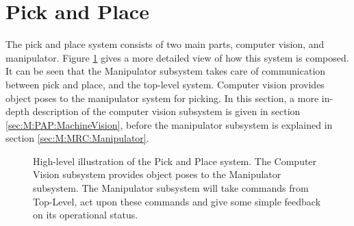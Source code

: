 





\newpage
\section{Pick and Place} \label{M:PickAndPlace}
The pick and place system consists of two main parts, computer vision, and manipulator. Figure \ref{fig:M:PAP:PickAndPlaceMethod} gives a more detailed view of how this system is composed. It can be seen that the Manipulator subsystem takes care of communication between pick and place, and the top-level system. Computer vision provides object poses to the manipulator system for picking. In this section, a more in-depth description of the computer vision subsystem is given in section \ref{sec:M:PAP:MachineVision}, before the manipulator subsystem is explained in section \ref{sec:M:MRC:Manipulator}.

\begin{figure}[htp!]
    \fontsize{8}{14}\selectfont
    \centering
    
    \caption{High-level illustration of the Pick and Place system. The Computer Vision subsystem provides object poses to the Manipulator subsystem. The Manipulator subsystem will take commands from Top-Level, act upon these commands and give some simple feedback on its operational status.}
    \label{fig:M:PAP:PickAndPlaceMethod}
\end{figure}

